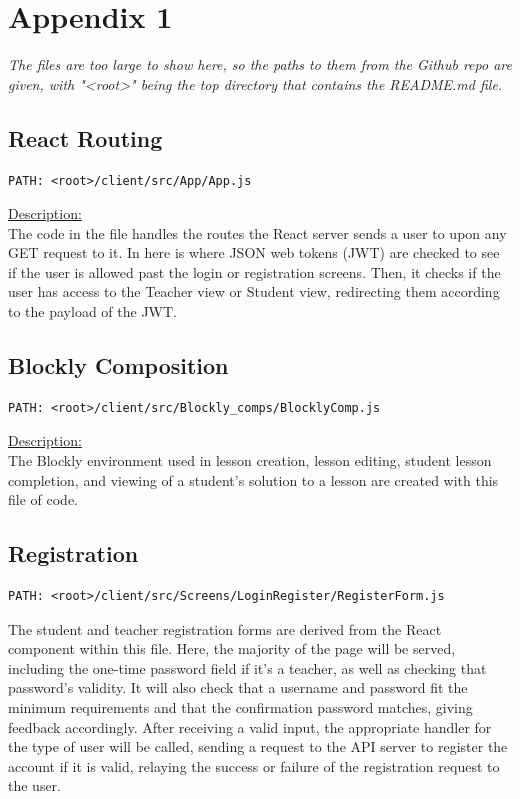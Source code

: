 \documentclass[draftclsnofoot,10pt,onecolumn]{IEEEtran}
\begin{document}
\clearpage

\section{Appendix 1}%
\emph{The files are too large to show here, so the paths to them from the Github repo are given, with "<root>" being the top directory that contains the README.md file.}
\subsection{React Routing}
\begin{lstlisting}
PATH: <root>/client/src/App/App.js
\end{lstlisting}
\underline{Description:} \\
The code in the file handles the routes the React server sends a user to upon any GET request to it. In here is where JSON web tokens (JWT) are checked to see if the user is allowed past the login or registration screens. Then, it checks if the user has access to the Teacher view or Student view, redirecting them according to the payload of the JWT.\\

\subsection{Blockly Composition}
\begin{lstlisting}
PATH: <root>/client/src/Blockly_comps/BlocklyComp.js
\end{lstlisting}
\underline{Description:} \\
The Blockly environment used in lesson creation, lesson editing, student lesson completion, and viewing of a student's solution to a lesson are created with this file of code. \\

\subsection{Registration}
\begin{lstlisting}
PATH: <root>/client/src/Screens/LoginRegister/RegisterForm.js
\end{lstlisting}
The student and teacher registration forms are derived from the React component within this file. Here, the majority of the page will be served, including the one-time password field if it's a teacher, as well as checking that password's validity. It will also check that a username and password fit the minimum requirements and that the confirmation password matches, giving feedback accordingly. After receiving a valid input, the appropriate handler for the type of user will be called, sending a request to the API server to register the account if it is valid, relaying the success or failure of the registration request to the user. 
\end{document}

